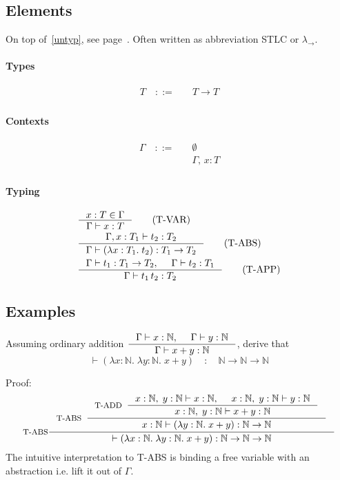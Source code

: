 \documentclass{article}
\newcommand{\nset}{\mathbb{N}}
\newcommand{\lamt}[3]{\lambda #1: #2 .\;#3}
\newcommand{\app}[2]{#1\, #2}
\newcommand{\typjud}[2]{\Gamma \vdash #1: #2}
\newcommand{\typjudp}[2]{\Gamma \vdash \left(#1\right): #2}
\begin{document}
\subsection{Elements}
  \label{simtyp}
  On top of~\ref{untyp}, see page~\pageref{untyp}.
  Often written as abbreviation STLC or $\lambda_{\to}$.

\paragraph{Types}
  \begin{align*}
    T \quad::= \quad & T \to T \tag{function type} \\
  \end{align*}

\paragraph{Contexts}
  \begin{align*}
    \Gamma \quad ::= \quad & \emptyset \tag{empty} \\
      & \Gamma, \, x : T \tag{variable binding} \\
  \end{align*}

\paragraph{Typing}
  \begin{align*}
    & \inference{x:T \in \Gamma}{\typjud{x}{T}} \tag{T-VAR} \\
    & \inference
      {\Gamma, x: T_1 \vdash t_2: T_2}
      {\typjudp{\lamt{x}{T_1}{t_2}}{T_1 \to T_2}}
      \tag{T-ABS} \\
    & \inference{\typjud{t_1}{T_1 \to T_2}, & \typjud{t_2}{T_1}}{\typjud{\app{t_1}{t_2}}{T_2}} \tag{T-APP} \\
  \end{align*}

\subsection{Examples}
  Assuming ordinary addition $\inference{\typjud{x}{\nset},& \typjud{y}{\nset}}{\typjud{x+y}{\nset}}$, derive that \[
    \vdash \left(\lamt{x}{\nset}{\lamt{y}{\nset}{x+y}}\right)\quad:\quad \nset\to\nset\to\nset\]

  Proof:
  \[
    \inference[T-ABS]
    {\inference[T-ABS]
      {\inference[T-ADD]
        {
          x:\nset, \;y:\nset\vdash x: \nset,&
          x:\nset, \;y:\nset\vdash y: \nset
        }
        {x:\nset, \;y:\nset\vdash x+y: \nset}
      }
      {x:\nset \vdash (\lamt{y}{\nset}{x+y}) : \nset\to\nset}
    }
    {\vdash \left(\lamt{x}{\nset}{\lamt{y}{\nset}{x+y}}\right): \nset\to\nset\to\nset}
  \]
  The intuitive interpretation to T-ABS is binding a free variable with an abstraction i.e. lift it out of $\Gamma$.
\end{document}
